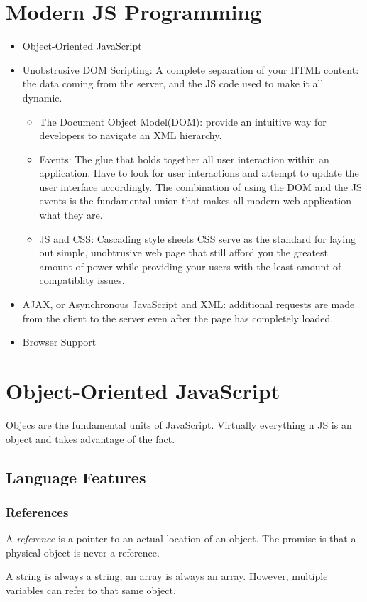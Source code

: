 \documentclass[a4paper,11pt]{book}
\begin{document}
\chapter{Modern JS Programming}
\begin{itemize}
\item Object-Oriented JavaScript
\item Unobstrusive DOM Scripting: A complete separation of your HTML content:
the data coming from the server, and the JS code used to make it all dynamic.
  \begin{itemize}
  \item The Document Object Model(DOM): provide an intuitive way for developers
  to navigate an XML hierarchy. 
  \item Events: The glue that holds together all user interaction within an
  application. Have to look for user interactions and attempt to update the user
  interface accordingly. The combination of using the DOM and the JS events is
  the fundamental union that makes all modern web application what they are.
  \item JS and CSS: Cascading style sheets CSS serve as the standard for laying
  out simple, unobtrusive web page that still afford you the greatest amount of
  power while providing your users with the least amount of compatiblity
  issues.
  \end{itemize}
\item AJAX, or Asynchronous JavaScript and XML: additional requests are made
from the client to the server even after the page has completely loaded.
\item Browser Support
\end{itemize}
\chapter{Object-Oriented JavaScript}
Objecs are the fundamental units of JavaScript. Virtually everything n JS is an
object and takes advantage of the fact. 
\section{Language Features}
\subsection{References}
A \emph{reference} is a pointer to an actual location of an object. The promise
is that a physical object is never a reference. 

A string is always a string; an array is always an array. However, multiple
variables can refer to that same object. 
\end{document}
